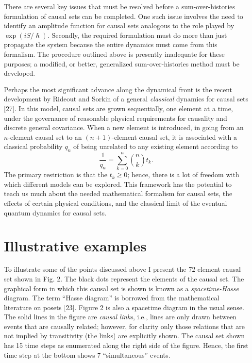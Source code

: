 There are several key issues that must be resolved before a
sum-over-histories formulation of causal sets can be completed. One such
issue involves the need to identify an amplitude function for causal sets
analogous to the role played by $\exp (iS/\hslash )$. Secondly, the required
formulation must do more than just propagate the system because the entire
dynamics must come from this formalism. The procedure outlined above is
presently inadequate for these purposes; a modified, or better, generalized
sum-over-histories method must be developed.

Perhaps the most significant advance along the dynamical front is the recent
development by Rideout and Sorkin of a general {\it classical} dynamics for
causal sets [27]. In this model, causal sets are grown sequentially, one
element at a time, under the governance of reasonable physical requirements
for causality and discrete general covariance. When a new element is
introduced, in going from an $n$-element causal set to an $(n+1)$-element
causal set, it is associated with a classical probability $q_n$ of being
unrelated to any existing element according to 
\[
\frac 1{q_n}=\sum\limits_{k=0}^n%
{n \choose k}%
t_k. 
\]
The primary restriction is that the $t_k\geq 0$; hence, there is a lot of
freedom with which different models can be explored. This framework has the
potential to teach us much about the needed mathematical formalism for
causal sets, the effects of certain physical conditions, and the classical
limit of the eventual quantum dynamics for causal sets.

\section{Illustrative examples}

To illustrate some of the points discussed above I present the 72 element
causal set shown in Fig. 2. The black dots represent the elements of the
causal set. The graphical form in which this causal set is shown is known as
a {\it spacetime-Hasse} diagram. The term ``Hasse diagram'' is borrowed from
the mathematical literature on posets [23]. Figure 2 is also a spacetime
diagram in the usual sense. The solid lines in the figure are {\it causal
links}, i.e., lines are only drawn between events that are causally related;
however, for clarity only those relations that are not implied by
transitivity (the links) are explicitly shown. The causal set shown has 15
time steps as enumerated along the right side of the figure. Hence, the
first time step at the bottom shows 7 ``simultaneous'' events.

